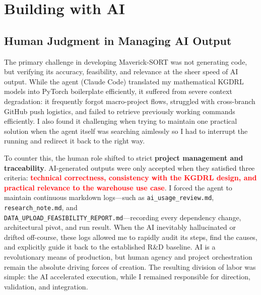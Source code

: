 
\section{Building with AI}\label{sec:building}

\subsection{Human Judgment in Managing AI Output}

The primary challenge in developing Maverick-SORT was not generating code, but verifying its accuracy, feasibility, and relevance at the sheer speed of AI output. While the agent (Claude Code) translated my mathematical KGDRL models into PyTorch boilerplate efficiently, it suffered from severe context degradation: it frequently forgot macro-project flows, struggled with cross-branch GitHub push logistics, and failed to retrieve previously working commands efficiently. I also found it challenging when trying to maintain one practical solution when the agent itself was searching aimlessly so I had to interrupt the running and redirect it back to the right way.  

To counter this, the human role shifted to strict \textbf{project management and traceability}. AI-generated outputs were only accepted when they satisfied three criteria: \textbf{\textcolor{red}{technical correctness, consistency with the KGDRL design, and practical relevance to the warehouse use case}}. I forced the agent to maintain continuous markdown logs---such as \texttt{ai\_usage\_review.md}, \texttt{research\_note.md}, and \\ \texttt{DATA\_UPLOAD\_FEASIBILITY\_REPORT.md}---recording every dependency change, architectural pivot, and run result. When the AI inevitably hallucinated or drifted off-course, these logs allowed me to rapidly audit its steps, find the causes, and explicitly guide it back to the established R\&D baseline. AI is a revolutionary means of production, but human agency and project orchestration remain the absolute driving forces of creation. The resulting division of labor was simple: the AI accelerated execution, while I remained responsible for direction, validation, and integration.


